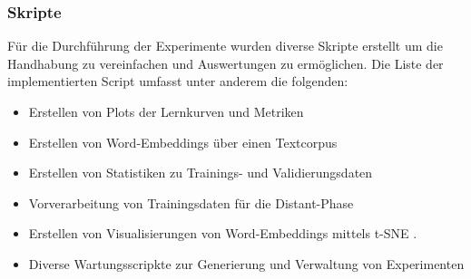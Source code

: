 \subsubsection{Skripte}
\label{technical_setup:scripts}
Für die Durchführung der Experimente wurden diverse Skripte erstellt um die Handhabung zu vereinfachen und Auswertungen zu ermöglichen. Die Liste der implementierten Script umfasst unter anderem die folgenden:

\begin{itemize}[noitemsep]
	\item Erstellen von Plots der Lernkurven und Metriken
	\item Erstellen von Word-Embeddings über einen Textcorpus
	\item Erstellen von Statistiken zu Trainings- und Validierungsdaten
	\item Vorverarbeitung von Trainingsdaten für die Distant-Phase
	\item Erstellen von Visualisierungen von Word-Embeddings mittels t-SNE \cite{maaten2008visualizing}.
	\item Diverse Wartungsscripkte zur Generierung und Verwaltung von Experimenten
\end{itemize}

